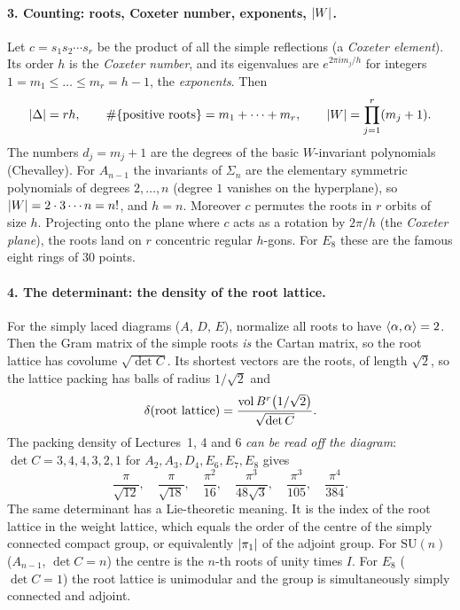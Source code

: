 \paragraph{3. Counting: roots, Coxeter number, exponents, $\left\lvert W \right\rvert$.} Let $c=s_1s_2\cdots s_r$ be the
product of all the simple reflections (a \emph{Coxeter element}). Its order $h$ is the \emph{Coxeter
number}, and its eigenvalues are $e^{2\pi im_j/h}$ for integers $1=m_1\le\dots\le m_r=h-1$, the
\emph{exponents}. Then
\[
  \left\lvert \Delta \right\rvert=rh,\qquad \#\{\text{positive roots}\}=m_1+\dots+m_r,\qquad
  \left\lvert W \right\rvert=\prod_{j=1}^r(m_j+1).
\]
The numbers $d_j=m_j+1$ are the degrees of the basic $W$-invariant polynomials (Chevalley). For
$A_{n-1}$ the invariants of $\Sigma_n$ are the elementary symmetric polynomials of degrees $2,\dots,n$
(degree $1$ vanishes on the hyperplane), so $\left\lvert W \right\rvert=2\cdot3\cdots n=n!$, and $h=n$. Moreover $c$
permutes the roots in $r$ orbits of size $h$. Projecting onto the plane where $c$ acts as a rotation
by $2\pi/h$ (the \emph{Coxeter plane}), the roots land on $r$ concentric regular $h$-gons. For $E_8$
these are the famous eight rings of $30$ points.

\paragraph{4. The determinant: the density of the root lattice.} For the simply laced diagrams
($A$, $D$, $E$), normalize all roots to have $\langle \alpha, \alpha\rangle=2$. Then the Gram matrix of the simple
roots \emph{is} the Cartan matrix, so the root lattice has covolume $\sqrt{\det C}$. Its shortest
vectors are the roots, of length $\sqrt2$, so the lattice packing has balls of radius $1/\sqrt2$ and
\[
  \delta(\text{root lattice})=\frac{\operatorname{vol}B^r\big(1/\sqrt2\big)}{\sqrt{\det C}}.
\]
The packing density of Lectures~1, 4 and 6 \emph{can be read off the diagram}: $\det C=3,4,4,3,2,1$ for
$A_2,A_3,D_4,E_6,E_7,E_8$ gives
\[
  \frac{\pi}{\sqrt{12}},\quad \frac{\pi}{\sqrt{18}},\quad \frac{\pi^2}{16},\quad
  \frac{\pi^3}{48\sqrt3},\quad \frac{\pi^3}{105},\quad \frac{\pi^4}{384}.
\]
The same determinant has a Lie-theoretic meaning. It is the index of the root lattice in the weight
lattice, which equals the order of the centre of the simply connected compact group, or equivalently
$\left\lvert \pi_1 \right\rvert$ of the adjoint group. For $\mathrm{SU}(n)$ ($A_{n-1}$, $\det C=n$) the centre is the $n$-th
roots of unity times $I$. For $E_8$ ($\det C=1$) the root lattice is unimodular and the group is
simultaneously simply connected and adjoint.

